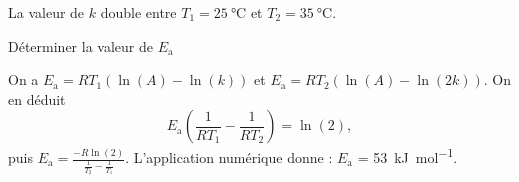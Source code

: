 \medskip

La valeur de $k$ double entre $T_1=\SI{25}{\celsius}$ et $T_2=\SI{35}{\celsius}$. 

\minusMedskip

\repriseEntrainement




\begin{enonce}
Déterminer la valeur de $E_\text{a}$
\end{enonce}


\begin{corrige}
On a $E_\text{a}=RT_1\left(\ln(A)-\ln(k)\right)$ et $E_\text{a}=RT_2\left(\ln(A)-\ln(2k)\right)$. On en déduit 
\[
E_\text{a}\left(\frac{1}{RT_1}-\frac{1}{RT_2}\right)=\ln(2),
\]
puis $E_\text{a}=\frac{-R\ln(2)}{\frac{1}{T_2}-\frac{1}{T_1}}$. L'application numérique donne : $E_\text{a}$ = \SI{53}{\kilo\joule\per\mol}.
 \end{corrige}


\finEntrainement






\hauteurLargeurCadreReponse		{8mm}{5cm}
\typeEntrainement				{} %
\initialisationEntrainement


